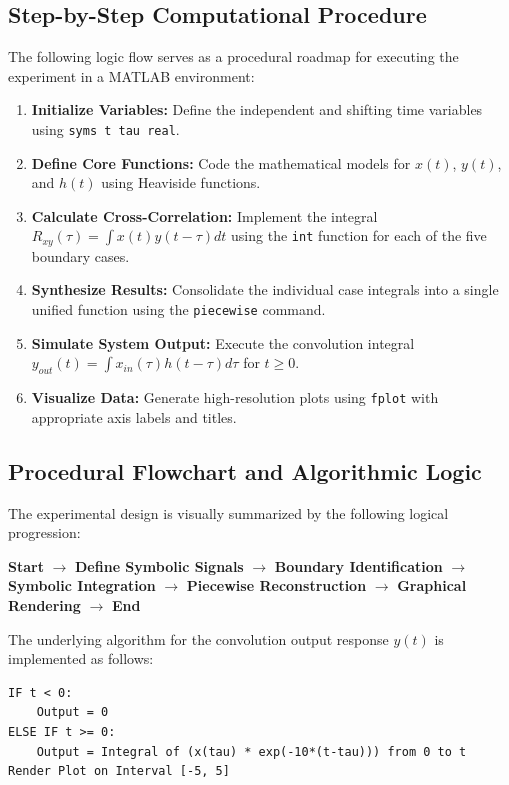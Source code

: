 \subsection{Step-by-Step Computational Procedure}
The following logic flow serves as a procedural roadmap for executing the experiment in a MATLAB environment:
\begin{enumerate}
    \item \textbf{Initialize Variables:} Define the independent and shifting time variables using \texttt{syms t tau real}.
    \item \textbf{Define Core Functions:} Code the mathematical models for $x(t)$, $y(t)$, and $h(t)$ using Heaviside functions.
    \item \textbf{Calculate Cross-Correlation:} Implement the integral $R_{xy}(\tau) = \int x(t)y(t-\tau) dt$ using the \texttt{int} function for each of the five boundary cases.
    \item \textbf{Synthesize Results:} Consolidate the individual case integrals into a single unified function using the \texttt{piecewise} command.
    \item \textbf{Simulate System Output:} Execute the convolution integral $y_{out}(t) = \int x_{in}(\tau)h(t-\tau) d\tau$ for $t \geq 0$.
    \item \textbf{Visualize Data:} Generate high-resolution plots using \texttt{fplot} with appropriate axis labels and titles.
\end{enumerate}

\subsection{Procedural Flowchart and Algorithmic Logic}
The experimental design is visually summarized by the following logical progression:
\begin{center}
    \textbf{Start} $\rightarrow$ \textbf{Define Symbolic Signals} $\rightarrow$ \textbf{Boundary Identification} $\rightarrow$ \textbf{Symbolic Integration} $\rightarrow$ \textbf{Piecewise Reconstruction} $\rightarrow$ \textbf{Graphical Rendering} $\rightarrow$ \textbf{End}
\end{center}

The underlying algorithm for the convolution output response $y(t)$ is implemented as follows:
\begin{lstlisting}[breaklines=true, basicstyle=\ttfamily]
IF t < 0:
    Output = 0
ELSE IF t >= 0:
    Output = Integral of (x(tau) * exp(-10*(t-tau))) from 0 to t
Render Plot on Interval [-5, 5]
\end{lstlisting}

